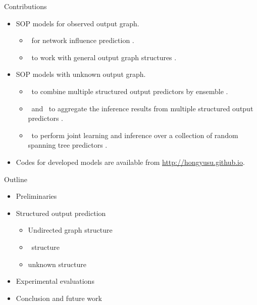 \documentclass[first=dgreen,second=purple,logo=yellowexc]{aaltoslides}
\begin{document}
%
\begin{frame}{Contributions}
	\begin{itemize}\footnotesize
		\item SOP models for observed output graph.
		\begin{itemize}\footnotesize
			\item \spin\ for network influence prediction \cite{su14structured}.
			\item \mmcrf\ to work with general output graph structures \cite{su10structured}.
		\end{itemize}
		\item SOP models with unknown output graph.
		\begin{itemize}\footnotesize
			\item \mve\ to combine multiple structured output predictors by ensemble \cite{su11mutitask}.
			\item \amm\ and \mam\ to aggregate the inference results from multiple structured output predictors \cite{su2013multilabelacml,su15multilabel}.
			\item \rta\ to perform joint learning and inference over a collection of random spanning tree predictors \cite{su14multilabelnips}.
		\end{itemize}
		\item Codes for developed models are available from \href{http://hongyusu.github.io}{http://hongyusu.github.io}.
	\end{itemize}
\end{frame}


%
\begin{frame}{Outline}
	\begin{itemize}\footnotesize
		\item Preliminaries
		\item Structured output prediction
		\begin{itemize}\footnotesize
			\item Undirected graph structure
			\item \daggraph\ structure
			\item unknown structure
		\end{itemize}
		\item Experimental evaluations
		\item Conclusion and future work
	\end{itemize}
\end{frame}
\end{document}
